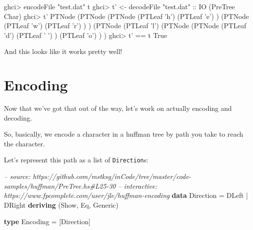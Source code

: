 \documentclass[]{article}
\newenvironment{Shaded}{}{}
\newcommand{\KeywordTok}[1]{\textcolor[rgb]{0.00,0.44,0.13}{\textbf{{#1}}}}
\newcommand{\DataTypeTok}[1]{\textcolor[rgb]{0.56,0.13,0.00}{{#1}}}
\newcommand{\CharTok}[1]{\textcolor[rgb]{0.25,0.44,0.63}{{#1}}}
\newcommand{\StringTok}[1]{\textcolor[rgb]{0.25,0.44,0.63}{{#1}}}
\newcommand{\CommentTok}[1]{\textcolor[rgb]{0.38,0.63,0.69}{\textit{{#1}}}}
\newcommand{\OtherTok}[1]{\textcolor[rgb]{0.00,0.44,0.13}{{#1}}}
\newcommand{\FunctionTok}[1]{\textcolor[rgb]{0.02,0.16,0.49}{{#1}}}
\newcommand{\NormalTok}[1]{{#1}}
\begin{document}
\begin{Shaded}
\begin{Highlighting}[]
\NormalTok{ghci}\FunctionTok{>} \NormalTok{encodeFile }\StringTok{"test.dat"} \NormalTok{t}
\NormalTok{ghci}\FunctionTok{>} \NormalTok{t' }\OtherTok{<-} \NormalTok{decodeFile }\StringTok{"test.dat"}\OtherTok{ ::} \DataTypeTok{IO} \NormalTok{(}\DataTypeTok{PreTree} \DataTypeTok{Char}\NormalTok{)}
\NormalTok{ghci}\FunctionTok{>} \NormalTok{t'}
\DataTypeTok{PTNode} \NormalTok{(}\DataTypeTok{PTNode} \NormalTok{(}\DataTypeTok{PTNode} \NormalTok{(}\DataTypeTok{PTLeaf} \CharTok{'h'}\NormalTok{)}
                       \NormalTok{(}\DataTypeTok{PTLeaf} \CharTok{'e'}\NormalTok{)}
               \NormalTok{)}
               \NormalTok{(}\DataTypeTok{PTNode} \NormalTok{(}\DataTypeTok{PTLeaf} \CharTok{'w'}\NormalTok{)}
                       \NormalTok{(}\DataTypeTok{PTLeaf} \CharTok{'r'}\NormalTok{)}
               \NormalTok{)}
       \NormalTok{)}
       \NormalTok{(}\DataTypeTok{PTNode} \NormalTok{(}\DataTypeTok{PTLeaf} \CharTok{'l'}\NormalTok{)}
               \NormalTok{(}\DataTypeTok{PTNode} \NormalTok{(}\DataTypeTok{PTNode} \NormalTok{(}\DataTypeTok{PTLeaf} \CharTok{'d'}\NormalTok{)}
                               \NormalTok{(}\DataTypeTok{PTLeaf} \CharTok{' '}\NormalTok{)}
                       \NormalTok{)}
                       \NormalTok{(}\DataTypeTok{PTLeaf} \CharTok{'o'}\NormalTok{)}
               \NormalTok{)}
       \NormalTok{)}
\NormalTok{ghci}\FunctionTok{>} \NormalTok{t' }\FunctionTok{==} \NormalTok{t}
\DataTypeTok{True}
\end{Highlighting}
\end{Shaded}

And this looks like it works pretty well!

\section{Encoding}\label{encoding}

Now that we've got that out of the way, let's work on actually encoding
and decoding.

So, basically, we encode a character in a huffman tree by path you take
to reach the character.

Let's represent this path as a list of \texttt{Direction}s:

\begin{Shaded}
\begin{Highlighting}[]
\CommentTok{-- source: https://github.com/mstksg/inCode/tree/master/code-samples/huffman/PreTree.hs#L25-30}
\CommentTok{-- interactive: https://www.fpcomplete.com/user/jle/huffman-encoding}
\KeywordTok{data} \DataTypeTok{Direction} \FunctionTok{=} \DataTypeTok{DLeft}
               \FunctionTok{|} \DataTypeTok{DRight}
               \KeywordTok{deriving} \NormalTok{(}\DataTypeTok{Show}\NormalTok{, }\DataTypeTok{Eq}\NormalTok{, }\DataTypeTok{Generic}\NormalTok{)}

\KeywordTok{type} \DataTypeTok{Encoding} \FunctionTok{=} \NormalTok{[}\DataTypeTok{Direction}\NormalTok{]}
\end{Highlighting}
\end{Shaded}
\end{document}
